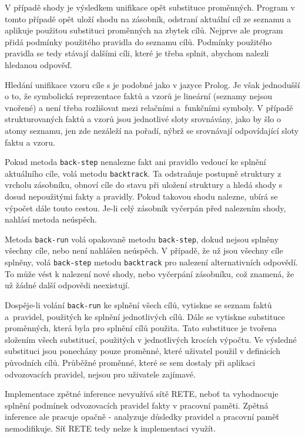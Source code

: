 V případě shody je výsledkem unifikace opět substituce proměnných. Program v
tomto případě opět uloží shodu na zásobník, odstraní aktuální cíl ze seznamu a
aplikuje použitou substituci proměnných na zbytek cílů. Nejprve ale program
přidá podmínky použitého pravidla do seznamu cílů. Podmínky použitého pravidla
se tedy stávají dalšími cíli, které je třeba splnit, abychom nalezli hledanou
odpověď.

Hledání unifikace vzoru cíle s  je podobné jako v jazyce
Prolog. Je však jednodušší o to, že symbolická reprezentace faktů a vzorů je
lineární (seznamy nejsou vnořené) a není třeba rozlišovat mezi relačními
a~funkčními symboly. V případě strukturovaných faktů a vzorů jsou jednotlivé
sloty srovnávány, jako by šlo o atomy seznamu, jen zde nezáleží na pořadí, nýbrž
se srovnávají odpovídající sloty faktu a vzoru.

Pokud metoda \verb|back-step| nenalezne fakt ani pravidlo vedoucí ke splnění
aktuálního cíle, volá metodu \verb|backtrack|. Ta odstraňuje postupně struktury z
vrcholu zásobníku, obnoví cíle do stavu při uložení struktury a hledá shody s
dosud nepoužitými fakty a pravidly. Pokud takovou shodu nalezne, ubírá se
výpočet dále touto cestou. Je-li celý zásobník vyčerpán před nalezením shody,
nahlásí metoda neúspěch.

Metoda \verb|back-run| volá opakovaně metodu \verb|back-step|, dokud nejsou
splněny všechny cíle, nebo není nahlášen neúspěch. V případě, že už jsou všechny
cíle splněny, volá \verb|back-step| metodu \verb|backtrack| pro nalezení
alternativních odpovědí. To může vést k nalezení nové shody, nebo vyčerpání
zásobníku, což znamená, že už žádné další odpovědi neexistují.

Dospěje-li volání \verb|back-run| ke splnění všech cílů, vytiskne se seznam
faktů a~pravidel, použitých ke splnění jednotlivých cílů. Dále se vytiskne
substituce proměnných, která byla pro splnění cílů použita. Tato substituce je
tvořena složením všech substitucí, použitých v jednotlivých krocích výpočtu. Ve
výsledné substituci jsou ponechány pouze proměnné, které uživatel použil v
definicích původních cílů. Průběžné proměnné, které se sem dostaly při aplikaci
odvozovacích pravidel, nejsou pro uživatele zajímavé.

Implementace zpětné inference nevyužívá sítě RETE, neboť ta vyhodnocuje splnění
podmínek odvozovacích pravidel fakty v pracovní paměti. Zpětná inference ale
pracuje opačně - analyzuje důsledky pravidel a pracovní paměť nemodifikuje. Síť
RETE tedy nelze k implementaci využít.

